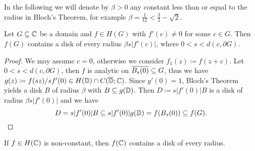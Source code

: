 In the following we will denote by $\beta > 0$ any constant less than or equal to the radius in Bloch's Theorem, for example $\beta = \frac{1}{12} < \frac{3}{2} - \sqrt{2}$.

\begin{corollary} \label{cor:bloch-domain}
    Let $G \subseteq \mathbb{C}$ be a domain and $f \in H(G)$ with $f'(c) \neq 0$ for some $c \in G$. Then $f(G)$ contains a disk of every radius $\beta s \vert f'(c) \vert$, where $0 < s < d(c, \partial G)$.
\end{corollary}

\begin{proof}
    We may assume $c = 0$, otherwise we consider $f_1(z) \coloneqq f(z+c)$. Let $0 < s < d(c, \partial G)$, then $f$ is analytic on $\overline{B_s(0)} \subseteq G$, thus we have $g(z) \coloneqq f(sz) / sf'(0) \in H(\mathbb{D}) \cap C(\overline{\mathbb{D}}; \mathbb{C})$. Since $g'(0) = 1$, Bloch's Theorem yields a disk $B$ of radius $\beta$ with $B \subseteq g(\mathbb{D})$. Then $D \coloneqq s \vert f'(0) \vert B$ is a disk of radius $\beta s \vert f'(0) \vert$ and we have
    \begin{equation*}
        D = s \vert f'(0) \vert B \subseteq s \vert f'(0) \vert g(\mathbb{D}) = f(B_s(0)) \subseteq f(G).
    \end{equation*}
\end{proof}

\begin{corollary} \label{cor:bloch-entire}
    If $f \in H(\mathbb{C})$ is non-constant, then $f(\mathbb{C})$ contains a disk of every radius.
\end{corollary}